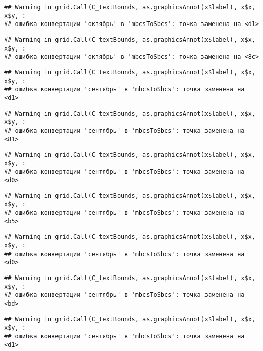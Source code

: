 \documentclass[
]{article}
\begin{document}
\begin{verbatim}
## Warning in grid.Call(C_textBounds, as.graphicsAnnot(x$label), x$x, x$y, :
## ошибка конвертации 'октябрь' в 'mbcsToSbcs': точка заменена на <d1>
\end{verbatim}

\begin{verbatim}
## Warning in grid.Call(C_textBounds, as.graphicsAnnot(x$label), x$x, x$y, :
## ошибка конвертации 'октябрь' в 'mbcsToSbcs': точка заменена на <8c>
\end{verbatim}

\begin{verbatim}
## Warning in grid.Call(C_textBounds, as.graphicsAnnot(x$label), x$x, x$y, :
## ошибка конвертации 'сентябрь' в 'mbcsToSbcs': точка заменена на <d1>
\end{verbatim}

\begin{verbatim}
## Warning in grid.Call(C_textBounds, as.graphicsAnnot(x$label), x$x, x$y, :
## ошибка конвертации 'сентябрь' в 'mbcsToSbcs': точка заменена на <81>
\end{verbatim}

\begin{verbatim}
## Warning in grid.Call(C_textBounds, as.graphicsAnnot(x$label), x$x, x$y, :
## ошибка конвертации 'сентябрь' в 'mbcsToSbcs': точка заменена на <d0>
\end{verbatim}

\begin{verbatim}
## Warning in grid.Call(C_textBounds, as.graphicsAnnot(x$label), x$x, x$y, :
## ошибка конвертации 'сентябрь' в 'mbcsToSbcs': точка заменена на <b5>
\end{verbatim}

\begin{verbatim}
## Warning in grid.Call(C_textBounds, as.graphicsAnnot(x$label), x$x, x$y, :
## ошибка конвертации 'сентябрь' в 'mbcsToSbcs': точка заменена на <d0>
\end{verbatim}

\begin{verbatim}
## Warning in grid.Call(C_textBounds, as.graphicsAnnot(x$label), x$x, x$y, :
## ошибка конвертации 'сентябрь' в 'mbcsToSbcs': точка заменена на <bd>
\end{verbatim}

\begin{verbatim}
## Warning in grid.Call(C_textBounds, as.graphicsAnnot(x$label), x$x, x$y, :
## ошибка конвертации 'сентябрь' в 'mbcsToSbcs': точка заменена на <d1>
\end{verbatim}
\end{document}

